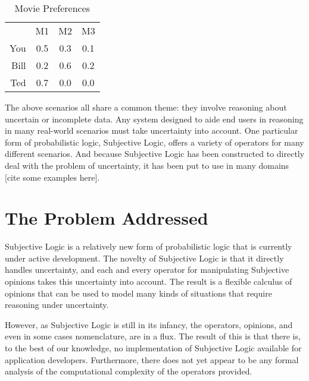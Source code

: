 \documentclass[thesis.tex]{subfiles}
\begin{document}
\begin{table}
  \begin{center}
    \begin{tabular}{ r|c|c|c| }
      \multicolumn{1}{r}{}
      &  \multicolumn{1}{c}{M1}
      &  \multicolumn{1}{c}{M2}
      &  \multicolumn{1}{c}{M3} \\
      \cline{2-4}
      You & 0.5 & 0.3 & 0.1 \\
      \cline{2-4}
      Bill & 0.2 & 0.6 & 0.2 \\
      \cline{2-4}
      Ted  & 0.7 & 0.0 & 0.0 \\
      \cline{2-4}
    \end{tabular}
  \end{center}

  \caption{Movie Preferences}
  \label{tbl:movies}
\end{table}

The above scenarios all share a common theme: they involve reasoning about uncertain or incomplete
data. Any system designed to aide end users in reasoning in many real-world scenarios must take
uncertainty into account. One particular form of probabilistic logic, Subjective Logic, offers a
variety of operators for many different scenarios. And because Subjective Logic has been
constructed to directly deal with the problem of uncertainty, it has been put to use in
many domains [cite some examples here].


\section{The Problem Addressed}

Subjective Logic is a relatively new form of probabilistic logic that is currently
under active development. The novelty of Subjective Logic is that it
directly handles uncertainty, and each and every operator for manipulating
Subjective opinions takes this uncertainty into account. The result is a
flexible calculus of opinions that can be used to model many kinds of
situations that require reasoning under uncertainty.

However, as Subjective Logic is still in its infancy, the operators, opinions, and
even in some cases nomenclature, are in a flux. The result of this is that
there is, to the best of our knowledge, no implementation of Subjective
Logic available for application developers. Furthermore, there does not
yet appear to be any formal analysis of the computational complexity of
the operators provided.
\end{document}
